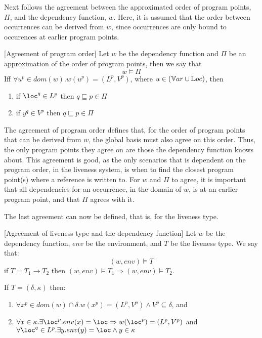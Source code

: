 \documentclass[../../master.tex]{subfiles}
\begin{document}
Next follows the agreement between the approximated order of program points, $\Pi$, and the dependency function, $w$.
Here, it is assumed that the order between occurrences can be derived from $w$, since occurrences are only bound to occurences at earlier program points.

\begin{definition}{[Agreement of program order]}
	Let $w$ be the dependency function and $\Pi$ be an approximation of the order of program points, then we say that
	$$w\models\Pi$$
	Iff $\forall u^p\in dom(w).w(u^p)=(L^p,V^p)$, where $u\in(\mathbb{V}ar\cup\mathbb{L}oc)$, then
	\begin{enumerate}
		\item if $\loc^q\in L^p$ then $q\sqsubseteq p\in\Pi$
		\item if $y^q\in V^p$ then $q\sqsubseteq p\in\Pi$
	\end{enumerate}
\end{definition}

The agreement of program order defines that, for the order of program points that can be derived from $w$, the global basis must also agree on this order.
Thus, the only program points they agree on are those the dependency function knows about.
This agreement is good, as the only scenarios that is dependent on the program order, in the liveness system, is when to find the closest program point(s) where a reference is written to.
For $w$ and $\Pi$ to agree, it is important that all dependencies for an occurrence, in the domain of $w$, is at an earlier program point, and that $\Pi$ agrees with it.
\bigskip

The last agreement can now be defined, that is, for the liveness type.

\begin{definition}{[Agreement of liveness type and the dependency function]}
	Let $w$ be the dependency function, $env$ be the environment, and $T$ be the liveness type.
	We say that:
	$$(w,env)\models T$$
	if $T=T_1\rightarrow T_2$ then $(w,env)\models T_1 \Rightarrow (w,env)\models T_2$.

	If $T=(\delta,\kappa)$ then:
	\begin{enumerate}
		\item $\forall x^p\in dom(w)\cap\delta. w(x^p)=(L^p,V^p)\wedge V^p\subseteq\delta$, and
		\item $\forall x\in\kappa.\exists \loc^p.env(x)=\loc \Rightarrow  w(\loc^p)=(L^p,V^p)$ and $\forall\loc^q\in L^p.\exists y.env(y)=\loc\wedge y\in\kappa$
	\end{enumerate}
\end{definition}
\end{document}
